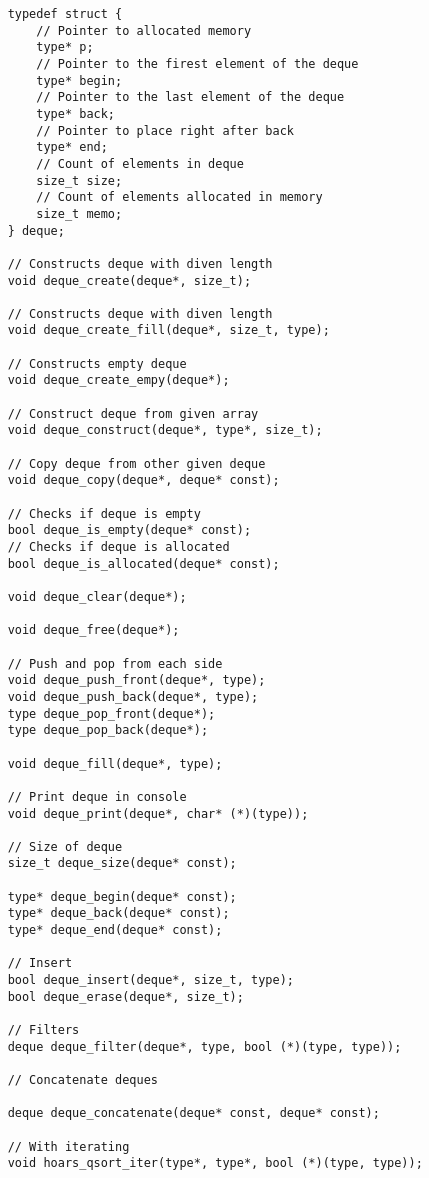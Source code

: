 \documentclass[a4paper]{article}
\newcounter{i}
\begin{document}
\begin{enumerate}[label=\textbf{\arabic*}.]
\begin{verbatim}
    typedef struct {
        // Pointer to allocated memory
        type* p;
        // Pointer to the firest element of the deque
        type* begin;
        // Pointer to the last element of the deque
        type* back;
        // Pointer to place right after back
        type* end;
        // Count of elements in deque
        size_t size;
        // Count of elements allocated in memory
        size_t memo;
    } deque;
    
    // Constructs deque with diven length
    void deque_create(deque*, size_t);
    
    // Constructs deque with diven length
    void deque_create_fill(deque*, size_t, type);
    
    // Constructs empty deque
    void deque_create_empy(deque*);
    
    // Construct deque from given array
    void deque_construct(deque*, type*, size_t);
    
    // Copy deque from other given deque
    void deque_copy(deque*, deque* const);
    
    // Checks if deque is empty
    bool deque_is_empty(deque* const);
    // Checks if deque is allocated
    bool deque_is_allocated(deque* const);
    
    void deque_clear(deque*);
    
    void deque_free(deque*);
    
    // Push and pop from each side
    void deque_push_front(deque*, type);
    void deque_push_back(deque*, type);
    type deque_pop_front(deque*);
    type deque_pop_back(deque*);
    
    void deque_fill(deque*, type);
    
    // Print deque in console
    void deque_print(deque*, char* (*)(type));
    
    // Size of deque
    size_t deque_size(deque* const);
    
    type* deque_begin(deque* const);
    type* deque_back(deque* const);
    type* deque_end(deque* const);
    
    // Insert
    bool deque_insert(deque*, size_t, type);
    bool deque_erase(deque*, size_t);
    
    // Filters
    deque deque_filter(deque*, type, bool (*)(type, type));
    
    // Concatenate deques
    
    deque deque_concatenate(deque* const, deque* const);
    
    // With iterating 
    void hoars_qsort_iter(type*, type*, bool (*)(type, type));
    

\end{verbatim}
\end{enumerate}
\end{document}
